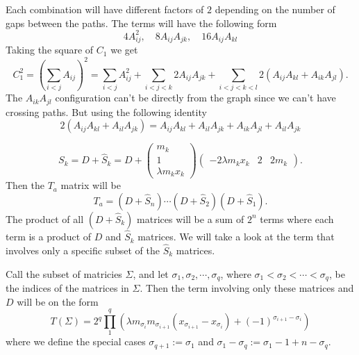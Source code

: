 \documentclass[english,master]{liumaiex}
\theoremstyle{plain}
\theoremstyle{definition}
\begin{document}
Each combination will have different factors of $2$ depending on the number of gaps between the paths. The terms will have the following form
\begin{equation}
	4 A_{ij}^2, \quad
	8 A_{ij} A_{jk}, \quad
	16 A_{ij} A_{kl}
\end{equation}
Taking the square of $C_1$ we get
\begin{equation}
	C_1^2 = \left(\sum_{i<j} A_{ij}\right)^2
	= \sum_{i<j} A_{ij}^2 + \sum_{i<j<k} 2 A_{ij} A_{jk} + \sum_{i<j<k<l} 2(A_{ij} A_{kl} + A_{ik} A_{jl}).
\end{equation}
The $A_{ik} A_{jl}$ configuration can't be directly from the graph since we can't have crossing paths. But using the following identity
\begin{equation}
	2 (A_{ij} A_{kl} + A_{il} A_{jk}) = A_{ij} A_{kl} + A_{il} A_{jk} + A_{ik} A_{jl} + A_{il} A_{jk}
\end{equation}



\begin{equation}
	S_k = D + \hat{S}_k = D + 
	\begin{pmatrix}
		m_k \\ 1 \\ \lambda m_k x_k		
	\end{pmatrix}
	\begin{pmatrix}
		-2 \lambda m_k x_k & 2 & 2 m_k
	\end{pmatrix}.
\end{equation}
Then the $T_a$ matrix will be
\begin{equation}
	T_a = (D + \hat{S}_n)\cdots(D + \hat{S}_2)(D + \hat{S}_1).
\end{equation}
The product of all $(D + \hat{S}_k)$ matrices will be a sum of $2^n$ terms where each term is a product of $D$ and $\hat{S}_k$ matrices. We will take a look at the term that involves only a specific subset of the $\hat{S}_k$ matrices.

Call the subset of matricies $\Sigma$, and let $\sigma_1, \sigma_2, \cdots, \sigma_q$, where $\sigma_1 < \sigma_2 < \cdots < \sigma_q$, be the indices of the matrices in $\Sigma$. Then the term involving only these matrices and $D$ will be on the form
\begin{equation}
	T(\Sigma) = 2^q \prod_1^q (\lambda m_{\sigma_i} m_{\sigma_{i+1}} (x_{\sigma_{i+1}} - x_{\sigma_i}) + (-1)^{\sigma_{i+1} - \sigma_i})
\end{equation}
where we define the special cases $\sigma_{q+1} := \sigma_1$ and $\sigma_1 - \sigma_q := \sigma_1 - 1 + n - \sigma_q$.
\end{document}
